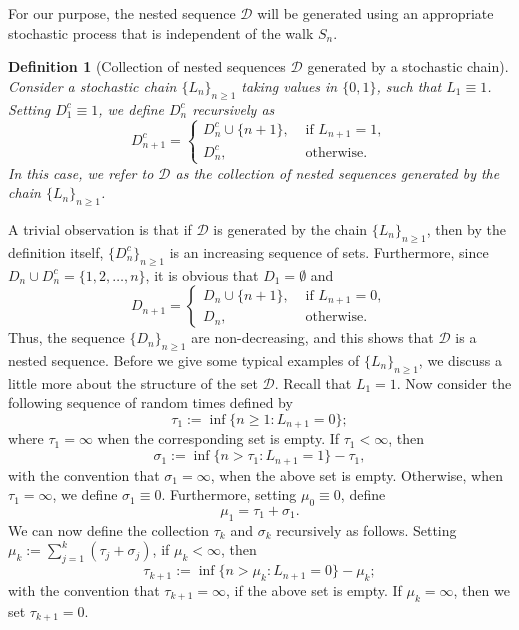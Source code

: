 \documentclass{article}
\numberwithin{equation}{section}
\newtheorem{defi}[theorem]{Definition}
\newcommand{\DD}{\mbox{${\mathcal D}$}}
\newcommand{\1}{\mathbf{1}}
\newcommand{\0}{\mathbf{0}}
\begin{document}
For our purpose, the nested sequence $\mathcal{D}$ will be generated using an appropriate stochastic process that is independent of the walk $S_n$.
\begin{defi}[Collection of nested sequences $\mathcal{D}$ generated by a stochastic chain]
Consider a stochastic chain $\{L_n\}_{n \ge 1}$ taking values in $\{0, 1\}$, such that $L_1 \equiv 1$.
Setting $D_1^c \equiv 1$, we define $D_n^c$ recursively as 
\begin{equation}
\label{Eq: Def_D_n_c}
D^c_{n+1}= \begin{cases}
D^c_n \cup \{n+1\}, & \text{ if } L_{n+1}=1,\\
D^c_n, & \text{ otherwise.}
\end{cases}
\end{equation}
In this case, we refer to $\mathcal{D}$ as the collection of nested sequences generated by the chain $\{L_n\}_{n \ge 1}$. 
\end{defi}
A trivial observation is that if $\mathcal{D}$ is generated by the chain $\{L_n\}_{n \ge 1}$, then by the definition itself, $\{D^c_{n}\}_{n \ge 1}$ is an increasing sequence of sets. Furthermore, since $D_n \cup D_n^c = \{1,2,\ldots, n\}$, it is obvious that $D_1 =\emptyset$ and 
\begin{equation}
\label{Eq: Def_D_n}
D_{n+1}= \begin{cases}
D_n \cup \{n+1\}, & \text{ if } L_{n+1}=0,\\
D_n, & \text{ otherwise.}
\end{cases}
\end{equation}
Thus, the sequence $\{D_n\}_{n \ge 1}$ are non-decreasing, and this shows that $\mathcal{D}$ is a nested sequence. 
Before we give some typical examples of $\{L_n\}_{n \ge 1}$, we discuss a little more about the structure of the set $\DD$.
Recall that $L_1=1$. Now consider the following sequence of random times defined by \begin{equation}
\label{Eq: Def_tau_1}
\tau_1 := \inf \{n \ge 1: L_{n+1}=0\}; 
\end{equation}
where $\tau_1= \infty$ when the corresponding set is empty. 
If $\tau_1< \infty$, then 
\begin{equation}
\label{Eq: Def_sigma_1}
\sigma_1 := \inf \{n > \tau_1: L_{n+1}=1\} -\tau_1,  
\end{equation} with the convention that $\sigma_1= \infty$, when the above set is empty.
Otherwise, when $\tau_1= \infty$, we define 
$\sigma_1 \equiv 0$.
Furthermore, setting $\mu_0 \equiv 0$, define
\begin{equation*}
\mu_1= \tau_1+\sigma_1.
\end{equation*}
We can now define the collection $\tau_k$ and $\sigma_k$ recursively as follows. Setting $\mu_k:= \sum_{j=1}^k (\tau_j+\sigma_j)$, if $\mu_k<\infty$, then  
\begin{equation}
\label{Eq: Def_tau_k+1}
\tau_{k+1} := \inf \{n > \mu_k: L_{n+1}=0\}-\mu_k; 
\end{equation}
with the convention that  $\tau_{k+1}= \infty$, if the above set is empty. If $\mu_k =\infty$, then we set $\tau_{k+1} = 0$.
\end{document}
